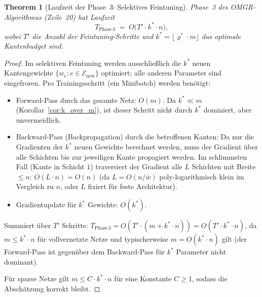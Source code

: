 \documentclass[12pt, a4paper, openany]{report}
\newtheorem{theorem}{Theorem}[chapter]
\newcommand{\calE}{\mathcal{E}}
\begin{document}
\begin{theorem}[Laufzeit der Phase~3: Selektives Feintuning]
\label{thm:runtime_phase3}
Phase~3 des OMGR-Algorithmus (Zeile~20) hat Laufzeit
\begin{equation}
  \label{eq:runtime_phase3}
  T_{\mathrm{Phase\,3}} \;=\; O\!\bigl(T' \cdot k^* \cdot n\bigr),
\end{equation}
wobei $T'$ die Anzahl der Feintuning-Schritte und
$k^* = \lfloor\varrho^* \cdot m\rfloor$ das optimale Kantenbudget sind.
\end{theorem}

\begin{proof}
Im selektiven Feintuning werden ausschließlich die $k^*$ neuen Kantengewichte
$\{w_e : e \in \calE_{\mathrm{new}}\}$ optimiert; alle anderen Parameter sind eingefroren.
Pro Trainingsschritt (ein Minibatch) werden benötigt:
\begin{itemize}
  \item Forward-Pass durch das gesamte Netz: $O(m)$.  Da $k^* \ll m$
    (Korollar~\ref{cor:k_over_m}), ist dieser Schritt nicht durch $k^*$
    dominiert, aber unvermeidlich.
  \item Backward-Pass (Backpropagation) durch die betroffenen Kanten:
    Da nur die Gradienten der $k^*$ neuen Gewichte berechnet werden,
    muss der Gradient über alle Schichten bis zur jeweiligen Kante
    propagiert werden.  Im schlimmsten Fall (Kante in Schicht $1$)
    traversiert der Gradient alle $L$ Schichten mit Breite $\leq n$:
    $O(L \cdot n) = O(n)$ (da $L = O(n/\bar{w})$ poly-logarithmisch klein
    im Vergleich zu $n$, oder $L$ fixiert für feste Architektur).
  \item Gradientupdate für $k^*$ Gewichte: $O(k^*)$.
\end{itemize}
Summiert über $T'$ Schritte: $T_{\mathrm{Phase\,3}} = O(T' \cdot (m + k^* \cdot n))
= O(T' \cdot k^* \cdot n)$, da $m \leq k^* \cdot n$ für vollvernetzte Netze
und typischerweise $m = O(k^* \cdot n)$ gilt (der Forward-Pass ist
gegenüber dem Backward-Pass für $k^*$ Parameter nicht dominant).

Für sparse Netze gilt $m \leq C \cdot k^* \cdot n$ für eine Konstante $C \geq 1$,
sodass die Abschätzung korrekt bleibt.
\end{proof}
\end{document}
